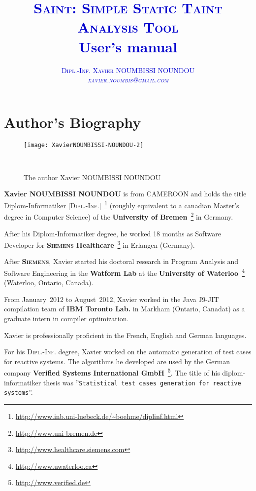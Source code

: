 \documentclass[11pt]{article} %
\newcommand{\company}[1]{\textbf{#1}\xspace}
\newcommand{\diplinf}{\textsc{Dipl.-Inf.}\xspace}
\begin{document}
\title{ \textcolor{mediumblue}{\textsc{Saint: Simple Static Taint Analysis Tool}\\
				\textcolor{mediumblue}{User's manual}}}
\author{ \textcolor{mediumblue}{\textsc{Dipl.-Inf. Xavier NOUMBISSI NOUNDOU}}\\
\textit{\textcolor{mediumblue}{\textsc{xavier.noumbis@gmail.com}}}}

\maketitle

\bigskip 

\tableofcontents

\newpage

\section{Author's Biography}
\begin{figure}[htpb]
\texttt{[image: XavierNOUMBISSI-NOUNDOU-2]}
\caption{The author Xavier NOUMBISSI NOUNDOU}~\label{fig:xaviernoumbis}
\end{figure}

\company{Xavier NOUMBISSI NOUNDOU} is from CAMEROON and holds the title Diplom-Informatiker
[\textsc{Dipl.-Inf.}]~\footnote{\url{http://www.inb.uni-luebeck.de/~boehme/diplinf.html}}
(roughly equivalent to a canadian Master's degree in Computer Science)
of the \company{University of Bremen}~\footnote{\url{http://www.uni-bremen.de}}
in Germany.

After his Diplom-Informatiker degree, he worked 18 months
as Software Developer for 
\company{\textsc{Siemens} Healthcare}~\footnote{\url{http://www.healthcare.siemens.com}}
in Erlangen (Germany).

After \company{\textsc{Siemens}}, Xavier started his doctoral
research in Program Analysis and Software Engineering in the
\company{Watform Lab} at the 
\company{University of Waterloo}~\footnote{\url{http://www.uwaterloo.ca}}
(Waterloo, Ontario, Canada).

From January~2012 to August~2012, Xavier worked in the Java J9-JIT
compilation team of \company{IBM Toronto Lab.} in Markham (Ontario, Canadat)
as a graduate intern in compiler optimization.

Xavier is professionally proficient in the French, English and
German languages.

For his \diplinf degree, Xavier worked on the automatic
generation of test cases for reactive systems. The algorithms
he developed are used by the German company
\company{Verified Systems International GmbH}~\footnote{\url{http://www.verified.de}}.
The title of his diplom-informatiker thesis was
''\texttt{Statistical test cases generation for reactive systems}''.
\end{document}
